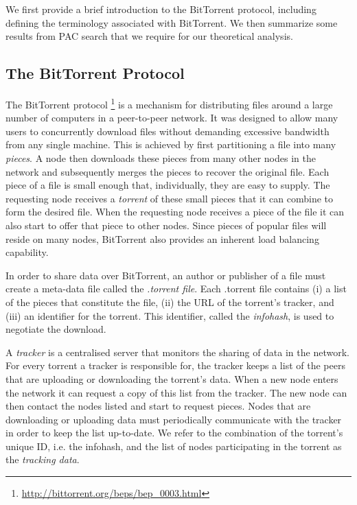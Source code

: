 We first provide a brief introduction to the BitTorrent protocol, including defining the terminology associated with BitTorrent. We then summarize some results from PAC search that we require for our theoretical analysis. 

\subsection{The BitTorrent Protocol}

    The BitTorrent protocol \footnote{\url{http://bittorrent.org/beps/bep_0003.html}} is a mechanism for distributing files around a large number of computers in a peer-to-peer network. It was designed to allow many users to concurrently download files without demanding excessive bandwidth from any single machine. This is achieved by first partitioning a file into many \emph{pieces}. A node then downloads these pieces from many other nodes in the network and subsequently merges the pieces to recover the original file. Each piece of a file is small enough that, individually, they are easy to supply. The requesting node receives a \emph{torrent} of these small pieces that it can combine to form the desired file. When the requesting node receives a piece of the file it can also start to offer that piece to other nodes. Since pieces of popular files will reside on many nodes, BitTorrent also provides an inherent load balancing capability.

    In order to share data over BitTorrent, an author or publisher of a file must create a meta-data file called the \emph{.torrent file}. Each .torrent file contains (i) a list of the pieces that constitute the file, (ii)  the URL of the torrent's tracker, and (iii) an identifier for the torrent. This identifier, called the \emph{infohash}, is used to negotiate the download.

    A \emph{tracker} is a centralised server that monitors the sharing of data in the network. For every torrent a tracker is responsible for, the tracker keeps a list of the peers that are uploading or downloading the torrent's data. When a new node enters the network it can request a copy of this list from the tracker. The new node can then contact the nodes listed and start to request pieces. Nodes that are downloading or uploading data must periodically communicate with the tracker in order to keep the list up-to-date. We refer to the combination of the torrent's unique ID, i.e. the infohash, and the list of nodes participating in the torrent as the {\em tracking data}.
    
